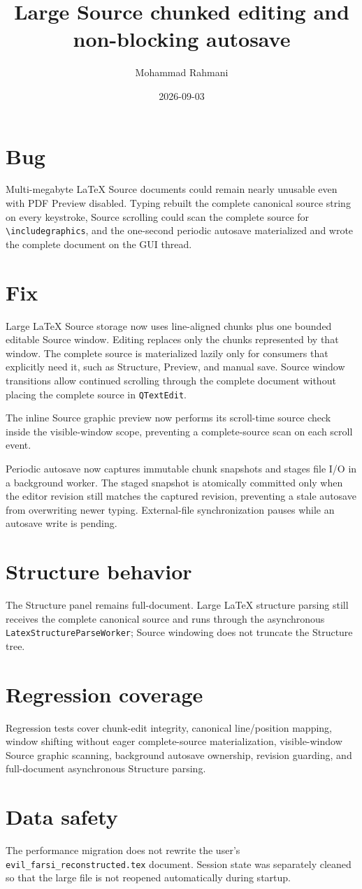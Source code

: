 \documentclass[a4paper]{article}
\title{Large Source chunked editing and non-blocking autosave}
\date{2026-09-03}
\author{Mohammad Rahmani}
\begin{document}
\maketitle

\section{Bug}
Multi-megabyte LaTeX Source documents could remain nearly unusable even with
PDF Preview disabled. Typing rebuilt the complete canonical source string on
every keystroke, Source scrolling could scan the complete source for
\verb|\includegraphics|, and the one-second periodic autosave materialized and
wrote the complete document on the GUI thread.

\section{Fix}
Large LaTeX Source storage now uses line-aligned chunks plus one bounded
editable Source window. Editing replaces only the chunks represented by that
window. The complete source is materialized lazily only for consumers that
explicitly need it, such as Structure, Preview, and manual save. Source window
transitions allow continued scrolling through the complete document without
placing the complete source in \texttt{QTextEdit}.

The inline Source graphic preview now performs its scroll-time source check
inside the visible-window scope, preventing a complete-source scan on each
scroll event.

Periodic autosave now captures immutable chunk snapshots and stages file I/O in
a background worker. The staged snapshot is atomically committed only when the
editor revision still matches the captured revision, preventing a stale
autosave from overwriting newer typing. External-file synchronization pauses
while an autosave write is pending.

\section{Structure behavior}
The Structure panel remains full-document. Large LaTeX structure parsing still
receives the complete canonical source and runs through the asynchronous
\texttt{LatexStructureParseWorker}; Source windowing does not truncate the
Structure tree.

\section{Regression coverage}
Regression tests cover chunk-edit integrity, canonical line/position mapping,
window shifting without eager complete-source materialization, visible-window
Source graphic scanning, background autosave ownership, revision guarding, and
full-document asynchronous Structure parsing.

\section{Data safety}
The performance migration does not rewrite the user's
\texttt{evil\_farsi\_reconstructed.tex} document. Session state was separately
cleaned so that the large file is not reopened automatically during startup.
\end{document}
